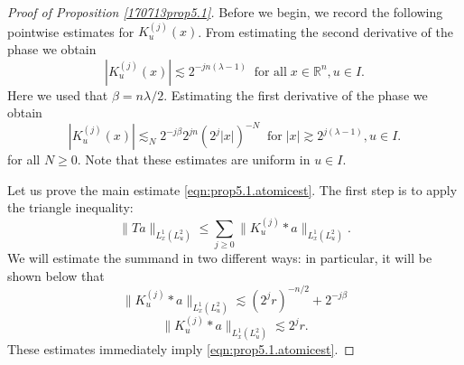 \documentclass[12pt,leqno]{amsart}
\def\R{\mathbb{R}}
\theoremstyle{plain}
\numberwithin{equation}{section}
\begin{document}
\begin{proof}[Proof of Proposition \ref{170713prop5.1}]
Before we begin, we record the following pointwise estimates for $K_u^{(j)}(x)$.
From estimating the second derivative of the phase we obtain
\begin{equation}\label{eqn:prop5.1.kernelest1}
|K_u^{(j)}(x)| \lesssim 2^{-jn(\lambda-1)}\;\;\text{for all}\;x\in\R^n, u\in I.
\end{equation}
Here we used that $\beta = n\lambda/2$.
Estimating the first derivative of the phase we obtain
\begin{equation}\label{eqn:prop5.1.kernelest2}
 |K_u^{(j)}(x)| \lesssim_N 2^{-j\beta} 2^{jn} (2^j |x|)^{-N}\;\;\text{for}\;|x|\gtrsim 2^{j(\lambda-1)}, u\in I.
\end{equation}
for all $N\ge 0$. Note that these estimates are uniform in $u\in I$.

Let us prove the main estimate \eqref{eqn:prop5.1.atomicest}. The first step is to apply the triangle inequality:
\[ \|T a\|_{L^1_x(L^2_u)} \le \sum_{j\ge 0} \| K_u^{(j)} * a\|_{L^1_x(L^2_u)}. \]
We will estimate the summand in two different ways: in particular, it will be shown below that
\begin{equation}\label{eqn:prop5.1.est1}
 \| K_u^{(j)} * a\|_{L^1_x(L^2_u)} \lesssim (2^j r)^{-n/2} + 2^{-j\beta}
\end{equation}
\begin{equation}\label{eqn:prop5.1.est2}
 \| K_u^{(j)} * a\|_{L^1_x(L^2_u)} \lesssim 2^j r.
\end{equation}
These estimates immediately imply \eqref{eqn:prop5.1.atomicest}.


\end{proof}
\end{document}
